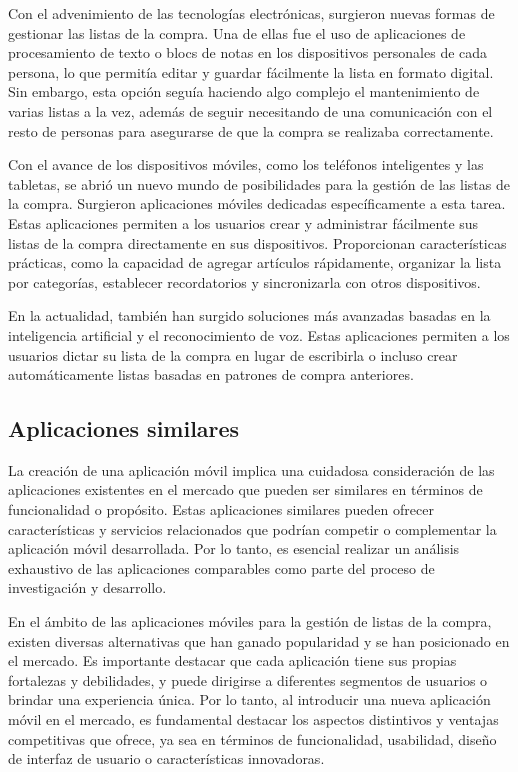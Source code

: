 \documentclass{article}
\begin{document}
Con el advenimiento de las tecnologías electrónicas, surgieron nuevas formas de gestionar las listas de la compra. Una de ellas fue el uso de aplicaciones de procesamiento de texto o blocs de notas en los dispositivos personales de cada persona, lo que permitía editar y guardar fácilmente la lista en formato digital. Sin embargo, esta opción seguía haciendo algo complejo el mantenimiento de varias listas a la vez, además de seguir necesitando de una comunicación con el resto de personas para asegurarse de que la compra se realizaba correctamente.

\newpage
Con el avance de los dispositivos móviles, como los teléfonos inteligentes y las tabletas, se abrió un nuevo mundo de posibilidades para la gestión de las listas de la compra. Surgieron aplicaciones móviles dedicadas específicamente a esta tarea. Estas aplicaciones permiten a los usuarios crear y administrar fácilmente sus listas de la compra directamente en sus dispositivos. Proporcionan características prácticas, como la capacidad de agregar artículos rápidamente, organizar la lista por categorías, establecer recordatorios y sincronizarla con otros dispositivos.

En la actualidad, también han surgido soluciones más avanzadas basadas en la inteligencia artificial y el reconocimiento de voz. Estas aplicaciones permiten a los usuarios dictar su lista de la compra en lugar de escribirla o incluso crear automáticamente listas basadas en patrones de compra anteriores.

\subsection{Aplicaciones similares}

La creación de una aplicación móvil implica una cuidadosa consideración de las aplicaciones existentes en el mercado que pueden ser similares en términos de funcionalidad o propósito. Estas aplicaciones similares pueden ofrecer características y servicios relacionados que podrían competir o complementar la aplicación móvil desarrollada. Por lo tanto, es esencial realizar un análisis exhaustivo de las aplicaciones comparables como parte del proceso de investigación y desarrollo.

En el ámbito de las aplicaciones móviles para la gestión de listas de la compra, existen diversas alternativas que han ganado popularidad y se han posicionado en el mercado. Es importante destacar que cada aplicación tiene sus propias fortalezas y debilidades, y puede dirigirse a diferentes segmentos de usuarios o brindar una experiencia única. Por lo tanto, al introducir una nueva aplicación móvil en el mercado, es fundamental destacar los aspectos distintivos y ventajas competitivas que ofrece, ya sea en términos de funcionalidad, usabilidad, diseño de interfaz de usuario o características innovadoras.
\end{document}
